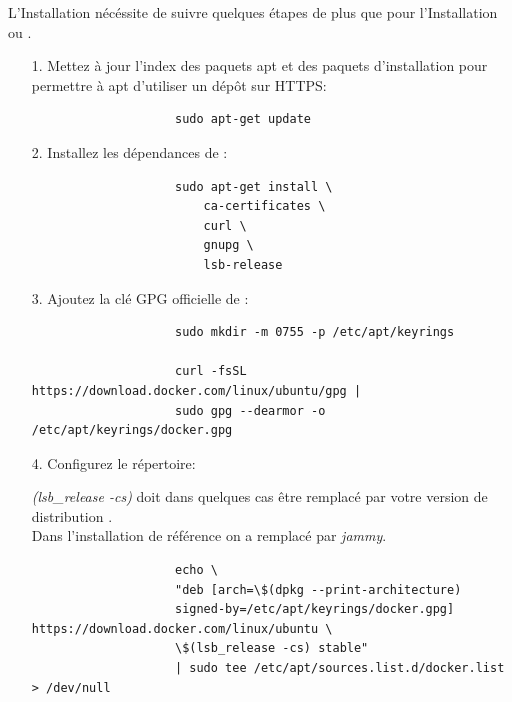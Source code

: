 \documentclass[internal]{nhitec_design}
\begin{document}
        L'Installation \linux{} nécéssite de suivre quelques étapes de plus que pour l'Installation \macos{} ou \windows{}.\\
        \begin{itemize}
     
            \item[1.] Mettez à jour l'index des paquets apt et des paquets d'installation pour permettre à apt d'utiliser un dépôt sur HTTPS:
            
                \begin{lstlisting}
                    sudo apt-get update
                \end{lstlisting}

            \item[2.] Installez les dépendances de \docker{}:

                \begin{lstlisting}
                    sudo apt-get install \
                        ca-certificates \
                        curl \
                        gnupg \
                        lsb-release
                \end{lstlisting}

\newpage

            \item[3.] Ajoutez la clé GPG officielle de \docker{}:

                \begin{lstlisting}
                    sudo mkdir -m 0755 -p /etc/apt/keyrings

                    curl -fsSL https://download.docker.com/linux/ubuntu/gpg | 
                    sudo gpg --dearmor -o /etc/apt/keyrings/docker.gpg
                \end{lstlisting}

            \item[4.] Configurez le répertoire:\\

                \begin{footnotesize}
                    \textit{\textdollar(lsb\_release -cs)} doit dans quelques cas être remplacé par votre version de distribution \linux{}.\\
                    Dans l'installation de référence on a remplacé par \textit{jammy}.
                \end{footnotesize}
                \begin{lstlisting}
                    echo \
                    "deb [arch=\$(dpkg --print-architecture) 
                    signed-by=/etc/apt/keyrings/docker.gpg] https://download.docker.com/linux/ubuntu \
                    \$(lsb_release -cs) stable" 
                    | sudo tee /etc/apt/sources.list.d/docker.list > /dev/null
                \end{lstlisting}


\end{itemize}
\end{document}

